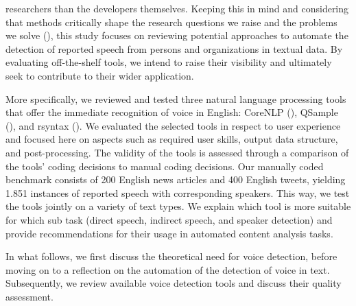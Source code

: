 \documentclass{ccr}
\begin{document}
researchers than the developers themselves. Keeping this in mind and considering that methods critically shape the research questions we raise and the problems we solve (\cite{waldherr2019messinstrumente}), this study focuses on reviewing potential approaches to automate the detection of reported speech from persons and organizations in textual data. By evaluating off-the-shelf tools, we intend to raise their visibility and ultimately seek to contribute to their wider application.

More specifically, we reviewed and tested three natural language processing tools that offer the immediate recognition of voice in English: CoreNLP (\cite{manning2014stanford}), QSample (\cite{scheible2016model}), and rsyntax (\cite{welbers2021extracting}). We evaluated the selected tools in respect to user experience and focused here on aspects such as required user skills, output data structure, and post-processing. The validity of the tools is assessed through a comparison of the tools’ coding decisions to manual coding decisions. Our manually coded benchmark consists of 200 English news articles and 400 English tweets, yielding 1.851 instances of reported speech with corresponding speakers. This way, we test the tools jointly on a variety of text types. We explain which tool is more suitable for which sub task (direct speech, indirect speech, and speaker detection) and provide recommendations for their usage in automated content analysis tasks.

In what follows, we first discuss the theoretical need for voice detection, before moving on to a reflection on the automation of the detection of voice in text. Subsequently, we review available voice detection tools and discuss their quality assessment.
\end{document}
